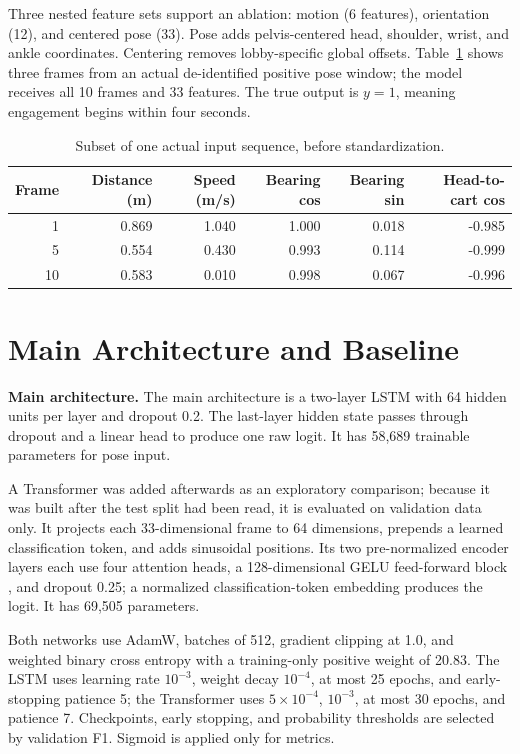 \documentclass[final]{article}
\begin{document}
Three nested feature sets support an ablation: motion (6 features), orientation (12), and centered pose (33). Pose adds pelvis-centered head, shoulder, wrist, and ankle coordinates. Centering removes lobby-specific global offsets. Table~\ref{tab:example} shows three frames from an actual de-identified positive pose window; the model receives all 10 frames and 33 features. The true output is $y=1$, meaning engagement begins within four seconds.

\begin{table}[!ht]
  \centering
  \scriptsize
  \caption{Subset of one actual input sequence, before standardization.}
  \label{tab:example}
  \begin{tabular}{rrrrrr}
    \toprule
    Frame & Distance (m) & Speed (m/s) & Bearing cos & Bearing sin & Head-to-cart cos \\
    \midrule
    1 & 0.869 & 1.040 & 1.000 & 0.018 & -0.985 \\
    5 & 0.554 & 0.430 & 0.993 & 0.114 & -0.999 \\
    10 & 0.583 & 0.010 & 0.998 & 0.067 & -0.996 \\
    \bottomrule
  \end{tabular}
\end{table}

\section*{Main Architecture and Baseline}

\textbf{Main architecture.} The main architecture is a two-layer LSTM with 64 hidden units per layer and dropout 0.2. The last-layer hidden state passes through dropout and a linear head to produce one raw logit. It has 58,689 trainable parameters for pose input.

A Transformer was added afterwards as an exploratory comparison; because it was built after the test split had been read, it is evaluated on validation data only. It projects each 33-dimensional frame to 64 dimensions, prepends a learned classification token, and adds sinusoidal positions. Its two pre-normalized encoder layers each use four attention heads, a 128-dimensional GELU feed-forward block \citep{hendrycks2016gelu}, and dropout 0.25; a normalized classification-token embedding produces the logit. It has 69,505 parameters.

Both networks use AdamW, batches of 512, gradient clipping at 1.0, and weighted binary cross entropy with a training-only positive weight of 20.83. The LSTM uses learning rate $10^{-3}$, weight decay $10^{-4}$, at most 25 epochs, and early-stopping patience 5; the Transformer uses $5\times10^{-4}$, $10^{-3}$, at most 30 epochs, and patience 7. Checkpoints, early stopping, and probability thresholds are selected by validation F1. Sigmoid is applied only for metrics.
\end{document}
